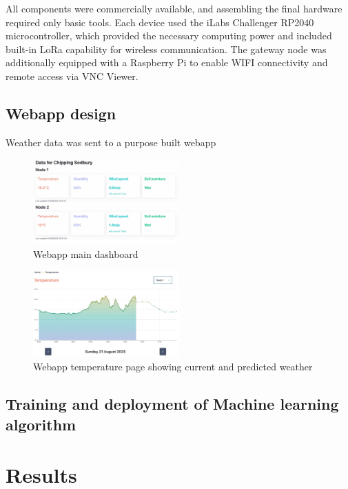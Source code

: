 \documentclass[conference]{IEEEtran}
\begin{document}
All components were commercially available, and assembling the final hardware
required only basic tools. Each device used the iLabs Challenger RP2040
microcontroller, which provided the necessary computing power and included
built-in LoRa capability for wireless communication. The gateway node was
additionally equipped with a Raspberry Pi to enable WIFI connectivity and
remote access via VNC Viewer.

\subsection{Webapp design}

Weather data was sent to a purpose built webapp 

\begin{figure}[htbp]
\centerline{\includegraphics[width=0.5\textwidth]{figures/main-page.jpg}}
\caption{Webapp main dashboard}
\label{dashboard}
\end{figure}

\begin{figure}[htbp]
\centerline{\includegraphics[width=0.5\textwidth]{figures/temperature-node-one.jpg}}
\caption{Webapp temperature page showing current and predicted weather}
\label{Temperature}
\end{figure}

\subsection{Training and deployment of Machine learning algorithm}

\section{Results}\label{RES}
\end{document}
